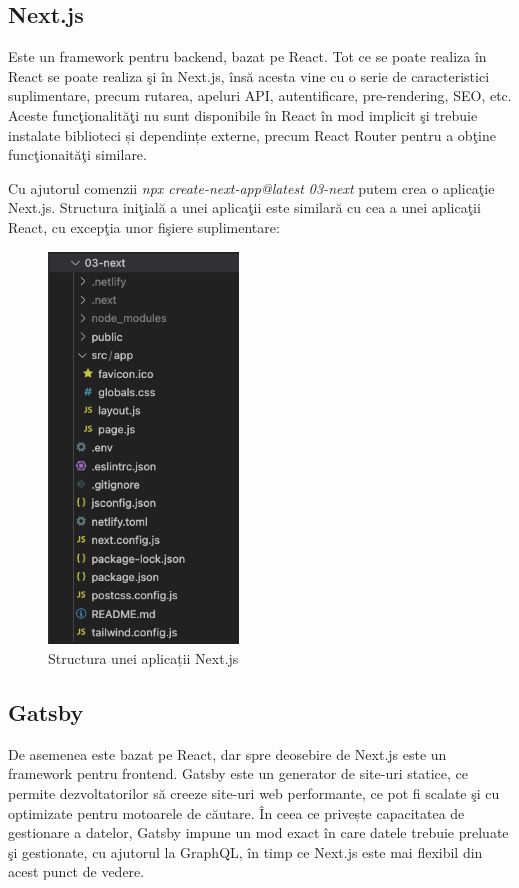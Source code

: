 \documentclass[12pt, a4paper]{report}
\begin{document}
\subsection{Next.js}
Este un framework pentru backend, bazat pe React. Tot ce se poate realiza \^in React se poate realiza \c si \^in Next.js, \^ins\u a acesta vine cu o serie de caracteristici suplimentare, precum rutarea, apeluri API, autentificare, pre-rendering, SEO, etc. Aceste func\c tionalit\u a\c ti nu sunt disponibile în React în mod implicit \c si trebuie instalate biblioteci și dependințe externe, precum React Router pentru a ob\c tine func\c tionait\u a\c ti similare.

Cu ajutorul comenzii \textit{npx create-next-app@latest 03-next} putem crea o aplica\c tie Next.js. Structura ini\c tial\u a a unei aplica\c tii este similar\u a cu cea a unei aplica\c tii React, cu excep\c tia unor fi\c siere suplimentare:
\begin{figure}[htbp]
	\centering
	\includegraphics[width=0.45\textwidth]{next_file_structure.png}
	\caption{Structura unei aplicații Next.js}
	\label{fig:next-structure}
\end{figure}


\subsection{Gatsby}
De asemenea este bazat pe React, dar spre deosebire de Next.js este un framework pentru frontend. Gatsby este un generator de site-uri statice, ce permite dezvoltatorilor să creeze site-uri web performante, ce pot fi scalate \c si cu optimizate pentru motoarele de c\u autare. În ceea ce privește capacitatea de gestionare a datelor, Gatsby impune un mod exact în care datele trebuie preluate \c si gestionate, cu ajutorul la GraphQL, în timp ce Next.js este mai flexibil din acest punct de vedere.
\end{document}
